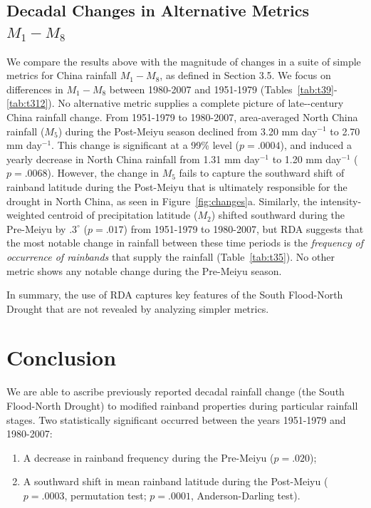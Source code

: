 \documentclass{ametsoc}
\begin{document}
\subsection{Decadal Changes in Alternative Metrics $M_1-M_8$}

	We compare the results above with the magnitude of changes in a suite of simple metrics for China rainfall $M_1-M_8$, as defined in Section 3.5. We focus on differences in $M_1-M_8$ between 1980-2007 and 1951-1979 (Tables~\ref{tab:t39}-\ref{tab:t312}). No alternative metric supplies a complete picture of late--century China rainfall change. From 1951-1979 to 1980-2007, area-averaged North China rainfall ($M_5$) during the Post-Meiyu season declined from 3.20 mm day$^{-1}$ to 2.70 mm day$^{-1}$. This change is significant at a 99\% level ($p=.0004$), and induced a yearly decrease in North China rainfall from 1.31 mm day$^{-1}$ to 1.20 mm day$^{-1}$  ($p=.0068$). However, the change in $M_5$ fails to capture the southward shift of rainband latitude during the Post-Meiyu that is ultimately responsible for the drought in North China, as seen in Figure~\ref{fig:changes}a. Similarly, the intensity-weighted centroid of precipitation latitude ($M_2$) shifted southward during the Pre-Meiyu by $.3^\circ$ ($p=.017$) from 1951-1979 to 1980-2007, but RDA suggests that the most notable change in rainfall between these time periods is the \textit{frequency of occurrence of rainbands} that supply the rainfall (Table~\ref{tab:t35}). No other metric shows any notable change during the Pre-Meiyu season. 
	
	In summary, the use of RDA captures key features of the South Flood-North Drought that are not revealed by analyzing simpler metrics.

\section{Conclusion}
	
	We are able to ascribe previously reported decadal rainfall change (the South Flood-North Drought) to modified rainband properties during particular rainfall stages. Two statistically significant occurred between the years 1951-1979 and 1980-2007: 

\begin{enumerate} 
\item A decrease in rainband frequency during the Pre-Meiyu ($p=.020$);
\item A southward shift in mean rainband latitude during the Post-Meiyu ($p=.0003$, permutation test; $p=.0001$, Anderson-Darling test). 
\end{enumerate}
	
\end{document}

